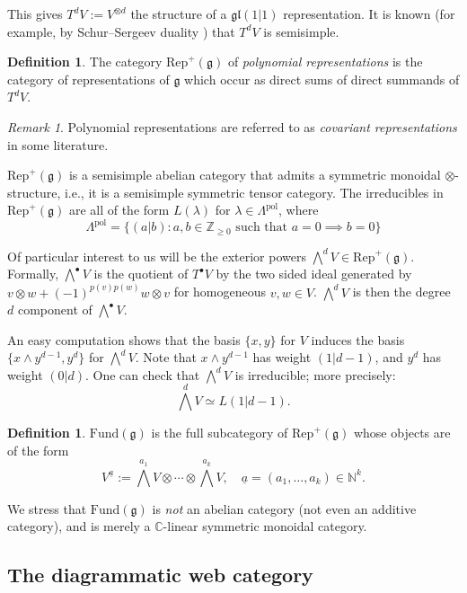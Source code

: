 \documentclass[11pt,a4paper,reqno]{amsart}
\newcommand{\g}{\mathfrak{g}}
\newcommand{\gl}{\mathfrak{gl}}
\newcommand{\rep}{\mathrm{Rep}}
\newcommand{\C}{\mathbb{C}}
\newcommand{\Z}{\mathbb{Z}}
\newcommand{\N}{\mathbb{N}}
\renewcommand{\a}{\alpha}
\numberwithin{equation}{section}
\renewcommand{\a}{\underline a}
\theoremstyle{definition}
\newtheorem{definition}[thm]{Definition}
\theoremstyle{remark}
\newtheorem{remark}[thm]{Remark}
\begin{document}
This gives $T^dV:= V^{\otimes d}$ the structure of a $\gl(1|1)$ representation. It is known (for example, by Schur--Sergeev duality \cite[Section 3.2]{cheng-wang}) that $T^dV$ is semisimple.

\begin{definition}
    The category $\rep^+(\g)$ of \emph{polynomial representations} is the category of representations of $\g$ which occur as direct sums of direct summands of $T^dV$.
\end{definition}

\begin{remark}
    Polynomial representations are referred to as \emph{covariant representations} in some literature.
\end{remark}

$\rep^+(\g)$ is a semisimple abelian category that admits a symmetric monoidal $\otimes$-structure, i.e., it is a semisimple symmetric tensor category. The irreducibles in $\rep^+(\g)$ are all of the form $L(\lambda)$ for $\lambda\in \Lambda^{\mathrm{pol}}$, where
\[\Lambda^{\mathrm{pol}} = \{(a|b): a, b\in \Z_{\ge 0}\text{ such that } a=0 \implies b=0\}\]

Of particular interest to us will be the exterior powers $\bigwedge^dV\in \rep^+(\g)$. Formally, $\bigwedge^\bullet V$ is the quotient of $T^\bullet V$ by the two sided ideal generated by $v\otimes w + (-1)^{p(v)p(w)}w\otimes v$ for homogeneous $v,w\in V$. $\bigwedge^d V$ is then the degree $d$ component of $\bigwedge^\bullet V$.

An easy computation shows that the basis $\{x,y\}$ for $V$ induces the basis $\{x\wedge y^{d-1}, y^d\}$ for $\bigwedge^d V$. Note that $x\wedge y^{d-1}$ has weight $(1|d-1)$, and $y^d$ has weight $(0|d)$. One can check that $\bigwedge^d V$ is irreducible; more precisely:
\[\bigwedge^d V \simeq L(1|d-1).\]

\begin{definition}
    $\mathrm{Fund}(\g)$ is the full subcategory of $\rep^+(\g)$ whose objects are of the form 
    \[V^{\a} := \bigwedge^{a_1}V\otimes \cdots \otimes \bigwedge^{a_k}V,\quad \a = (a_1, \dots, a_k)\in \N^k.\]
\end{definition}

We stress that $\mathrm{Fund}(\g)$ is \emph{not} an abelian category (not even an additive category), and is merely a $\C$-linear symmetric monoidal category.

\subsection{The diagrammatic web category}
\end{document}
